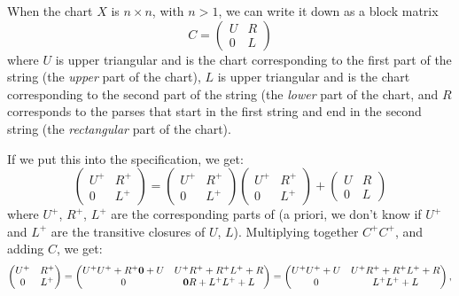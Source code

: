 When the chart $X$ is $n \times n$, with $n > 1$, we can write it down as a block matrix 
\begin{equation*}
  C = 
  \begin{pmatrix}
    U & R \\
    0 & L
  \end{pmatrix}
\end{equation*}
where $U$ is upper triangular and is the chart corresponding to the first part of the string (the \emph{upper} part of the chart), $L$ is upper triangular and is the chart corresponding to the second part of the string (the \emph{lower} part of the chart, and $R$ corresponds to the parses that start in the first string and end in the second string (the \emph{rectangular} part of the chart).

If we put this into the specification, we get:
\begin{equation*}
  \begin{pmatrix}
    U^+ & R^+ \\
    0   & L^+
  \end{pmatrix}
  =  
  \begin{pmatrix}
    U^+ & R^+ \\
    0   & L^+
  \end{pmatrix}
  \begin{pmatrix}
    U^+ & R^+ \\
    0   & L^+
  \end{pmatrix}
  +
  \begin{pmatrix}
    U & R \\
    0 & L
  \end{pmatrix}
\end{equation*}
where $U^+$, $R^+$, $L^+$ are the corresponding parts of (a priori, we don't know if $U^+$ and $L^+$ are the transitive closures of $U$, $L$). Multiplying together $C^+C^+$, and adding $C$, we get:
\begin{equation*}
    \begin{pmatrix}
    U^+ & R^+ \\
    0   & L^+
  \end{pmatrix} 
    =
  \begin{pmatrix}
    U^+U^+ + R^+\mathbf{0} + U   &   U^+R^+     + R^+L^+ + R \\
    0                          &   \mathbf{0} R + L^+L^+ + L
  \end{pmatrix}
  = 
  \begin{pmatrix}
    U^+U^+ + U                 &   U^+R^+ + R^+L^+ + R \\
    0                          &   L^+L^+ + L
  \end{pmatrix},
\end{equation*}

